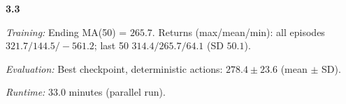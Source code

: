 \noindent\textbf{3.3}\par
\emph{Training:} Ending MA(50) = $265.7$. Returns (max/mean/min): all episodes $321.7/144.5/-561.2$; last 50 $314.4/265.7/64.1$ (SD $50.1$).\par
\emph{Evaluation:} Best checkpoint, deterministic actions: $278.4\pm 23.6$ (mean $\pm$ SD).\par
\emph{Runtime:} $33.0$ minutes (parallel run).\par
